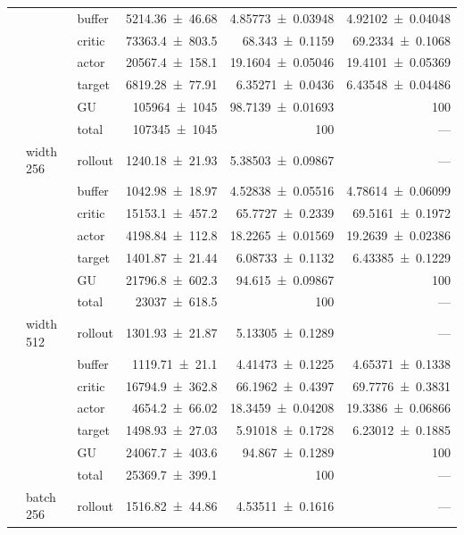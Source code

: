 {\begin{longtable}{@{}lllrrr@{}}
     &  & buffer & \num{5214.36+-46.68} & \num{4.85773+-0.03948} & \num{4.92102+-0.04048} \\
     &  & critic & \num{73363.4+-803.5} & \num{68.343+-0.1159} & \num{69.2334+-0.1068} \\
     &  & actor & \num{20567.4+-158.1} & \num{19.1604+-0.05046} & \num{19.4101+-0.05369} \\
     &  & target & \num{6819.28+-77.91} & \num{6.35271+-0.0436} & \num{6.43548+-0.04486} \\
     &  & GU & \num{105964+-1045} & \num{98.7139+-0.01693} & 100 \\
     &  & total & \num{107345+-1045} & \num{100} & --- \\
    \addlinespace[2pt]
     & width 256 & rollout & \num{1240.18+-21.93} & \num{5.38503+-0.09867} & --- \\
     &  & buffer & \num{1042.98+-18.97} & \num{4.52838+-0.05516} & \num{4.78614+-0.06099} \\
     &  & critic & \num{15153.1+-457.2} & \num{65.7727+-0.2339} & \num{69.5161+-0.1972} \\
     &  & actor & \num{4198.84+-112.8} & \num{18.2265+-0.01569} & \num{19.2639+-0.02386} \\
     &  & target & \num{1401.87+-21.44} & \num{6.08733+-0.1132} & \num{6.43385+-0.1229} \\
     &  & GU & \num{21796.8+-602.3} & \num{94.615+-0.09867} & 100 \\
     &  & total & \num{23037+-618.5} & \num{100} & --- \\
    \addlinespace[2pt]
     & width 512 & rollout & \num{1301.93+-21.87} & \num{5.13305+-0.1289} & --- \\
     &  & buffer & \num{1119.71+-21.1} & \num{4.41473+-0.1225} & \num{4.65371+-0.1338} \\
     &  & critic & \num{16794.9+-362.8} & \num{66.1962+-0.4397} & \num{69.7776+-0.3831} \\
     &  & actor & \num{4654.2+-66.02} & \num{18.3459+-0.04208} & \num{19.3386+-0.06866} \\
     &  & target & \num{1498.93+-27.03} & \num{5.91018+-0.1728} & \num{6.23012+-0.1885} \\
     &  & GU & \num{24067.7+-403.6} & \num{94.867+-0.1289} & 100 \\
     &  & total & \num{25369.7+-399.1} & \num{100} & --- \\
    \addlinespace[2pt]
     & batch 256 & rollout & \num{1516.82+-44.86} & \num{4.53511+-0.1616} & --- \\

\end{longtable}}
